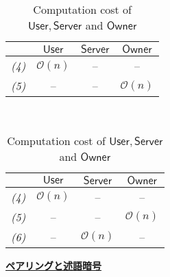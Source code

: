 \documentclass[a4paper]{jsarticle}
\begin{document}
\begin{table}[htb]
\begin{center}
  \begin{tabular}{|c|c|c|c|} \hline
      \backslashbox{}{}   & $\ \mathsf{User}\ $ & $\mathsf{Server}$ & $\mathsf{Owner}$ \\ \hline 
\it{(4)}& $\mathcal{O}(n)$ & -- & -- \\ \hline 
\it{(5)}& -- & -- & $\mathcal{O}(n)$ \\ \hline 
  \end{tabular}
  \caption{Communication cost of $\mathsf{User}, \mathsf{Server}$ and $\mathsf{Owner}$ }
  \label{Com2} %
\end{center}

\ \ \ 

\begin{center}
  \begin{tabular}{|c|c|c|c|} \hline
      \backslashbox{}{}   & $\ \mathsf{User}\ $ & $\mathsf{Server}$ & $\mathsf{Owner}$ \\ \hline 
\it{(4)}& $\mathcal{O}(n)$ & -- & -- \\ \hline 
\it{(5)}& -- & -- & $\mathcal{O}(n)$ \\ \hline 
\it{(6)}& -- & $\mathcal{O}(n)$ & -- \\ \hline 
  \end{tabular}
  \caption{Computation cost of $\mathsf{User}, \mathsf{Server}$ and $\mathsf{Owner}$ }
  \label{Com1} %
\end{center}
\end{table}

\newpage
\begin{center}
\LARGE{\textbf{\underline{ペアリングと述語暗号}}}
\end{center}
\setcounter{figure}{0}
\setcounter{table}{0}
\setcounter{equation}{0}
\setcounter{section}{0}
\end{document}

